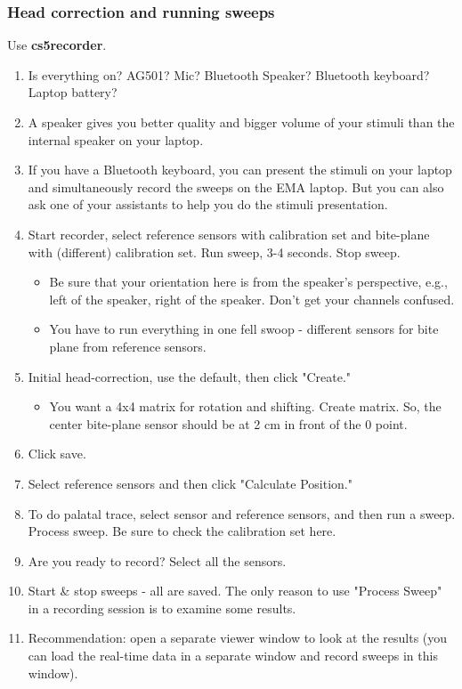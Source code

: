\documentclass[12pt]{article}
\begin{document}
    \subsubsection{Head correction and running sweeps}
    Use \textbf{cs5recorder}.
    \begin{enumerate}
        \item Is everything on? AG501? Mic? Bluetooth Speaker? Bluetooth keyboard? Laptop battery?
        \item A speaker gives you better quality and bigger volume of your stimuli than the internal speaker on your laptop.
        \item If you have a Bluetooth keyboard, you can present the stimuli on your laptop and simultaneously record the sweeps on the EMA laptop. But you can also ask one of your assistants to help you do the stimuli presentation.
        \item Start recorder, select reference sensors with calibration set and bite-plane with (different) calibration set. Run sweep, 3-4 seconds. Stop sweep.
        \begin{itemize}
            \item Be sure that your orientation here is from the speaker's perspective, e.g., left of the speaker, right of the speaker. Don't get your channels confused.
            \item You have to run everything in one fell swoop - different sensors for bite plane from reference sensors.
        \end{itemize}
        \item Initial head-correction, use the default, then click "Create."
        \begin{itemize}
            \item You want a 4x4 matrix for rotation and shifting. Create matrix. So, the center bite-plane sensor should be at 2 cm in front of the 0 point.
        \end{itemize}
        \item Click save.
        \item Select reference sensors and then click "Calculate Position."
        \item To do palatal trace, select sensor and reference sensors, and then run a sweep. Process sweep. Be sure to check the calibration set here.
        \item Are you ready to record? Select all the sensors.
        \item Start \& stop sweeps - all are saved. The only reason to use "Process Sweep" in a recording session is to examine some results.
        \item Recommendation: open a separate viewer window to look at the results (you can load the real-time data in a separate window and record sweeps in this window).
    \end{enumerate}
\end{document}
